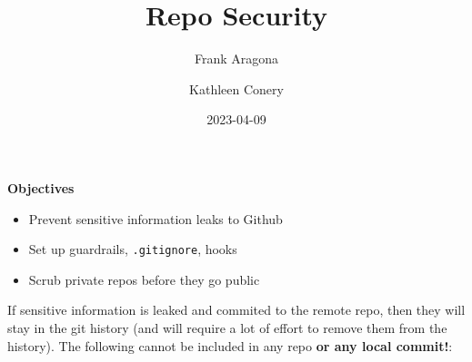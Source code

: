 \documentclass[
  letterpaper,
  DIV=11,
  numbers=noendperiod,
  oneside]{scrartcl}
\title{Repo Security}
\author{Frank Aragona \and Kathleen Conery}
\date{2023-04-09}
\providecommand{\tightlist}{%
  \setlength{\itemsep}{0pt}\setlength{\parskip}{0pt}}\usepackage{longtable,booktabs,array}
\begin{document}
\maketitle

 \textbf{Objectives}

\begin{itemize}
\tightlist
\item
  Prevent sensitive information leaks to Github
\item
  Set up guardrails, \texttt{.gitignore}, hooks
\item
  Scrub private repos before they go public
\end{itemize}

If sensitive information is leaked and commited to the remote repo, then
they will stay in the git history (and will require a lot of effort to
remove them from the history). The following cannot be included in any
repo \textbf{or any local commit!}:
\end{document}
